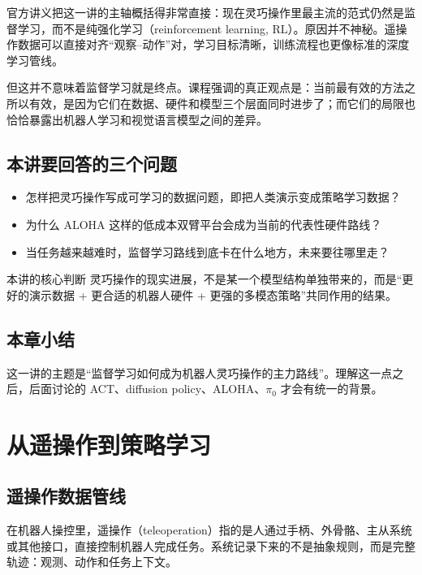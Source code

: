 \documentclass[a4paper]{article}
\begin{document}
官方讲义把这一讲的主轴概括得非常直接：现在灵巧操作里最主流的范式仍然是监督学习，而不是纯强化学习（reinforcement learning, RL）。原因并不神秘。遥操作数据可以直接对齐“观察--动作”对，学习目标清晰，训练流程也更像标准的深度学习管线。

但这并不意味着监督学习就是终点。课程强调的真正观点是：当前最有效的方法之所以有效，是因为它们在数据、硬件和模型三个层面同时进步了；而它们的局限也恰恰暴露出机器人学习和视觉语言模型之间的差异。

\subsection{本讲要回答的三个问题}

\begin{itemize}
  \item 怎样把灵巧操作写成可学习的数据问题，即把人类演示变成策略学习数据？
  \item 为什么 ALOHA 这样的低成本双臂平台会成为当前的代表性硬件路线？
  \item 当任务越来越难时，监督学习路线到底卡在什么地方，未来要往哪里走？
\end{itemize}

\begin{importantbox}{本讲的核心判断}
灵巧操作的现实进展，不是某一个模型结构单独带来的，而是“更好的演示数据 + 更合适的机器人硬件 + 更强的多模态策略”共同作用的结果。
\end{importantbox}

\subsection{本章小结}

这一讲的主题是“监督学习如何成为机器人灵巧操作的主力路线”。理解这一点之后，后面讨论的 ACT、diffusion policy、ALOHA、\(\pi_0\) 才会有统一的背景。

\section{从遥操作到策略学习}

\subsection{遥操作数据管线}

在机器人操控里，遥操作（teleoperation）指的是人通过手柄、外骨骼、主从系统或其他接口，直接控制机器人完成任务。系统记录下来的不是抽象规则，而是完整轨迹：观测、动作和任务上下文。
\end{document}
